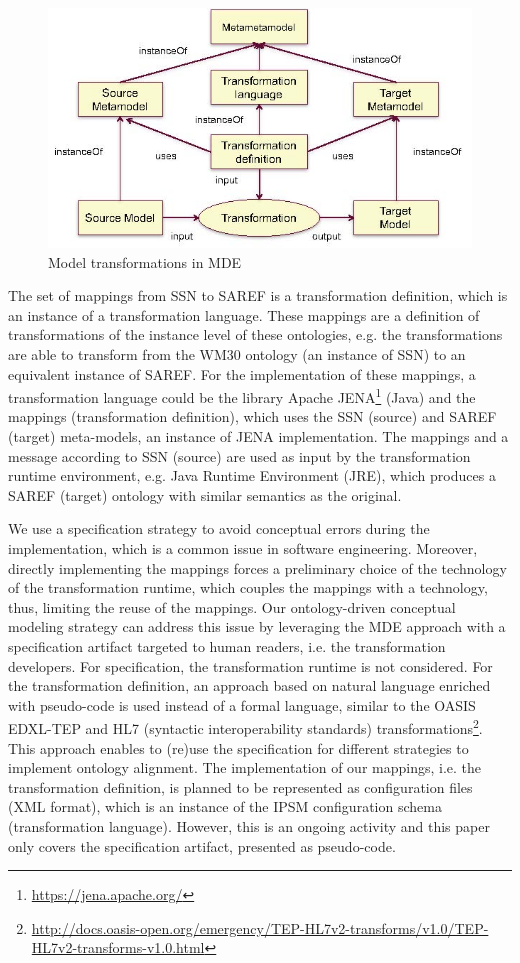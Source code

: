 \documentclass{sig-alternate-05-2015}
\begin{document}
\begin{figure}[h!]
\centering
\includegraphics[scale=0.39]{PastedGraphic-1}
\caption{Model transformations in MDE}
\label{fig:PastedGraphic-1}
\end{figure}

The set of mappings from SSN to SAREF is a transformation definition, which is an instance of a transformation language. These mappings are a definition of transformations of the instance level of these ontologies, e.g. the transformations are able to transform from the WM30 ontology (an instance of SSN) to an equivalent instance of SAREF. For the implementation of these mappings, a transformation language could be the library Apache JENA\footnote{\url{https://jena.apache.org/}} (Java) and the mappings (transformation definition), which uses the SSN (source) and SAREF (target) meta-models, an instance of JENA implementation. The mappings and a message according to SSN (source) are used as input by the transformation runtime environment, e.g. Java Runtime Environment (JRE), which produces a SAREF (target) ontology with similar semantics as the original. 

We use a specification strategy to avoid conceptual errors during the implementation, which is a common issue in software engineering. Moreover, directly implementing the mappings forces a preliminary choice of the technology of the transformation runtime, which couples the mappings with a technology, thus, limiting the reuse of the mappings. Our ontology-driven conceptual modeling strategy \cite{Moreira2017} can address this issue by leveraging the MDE approach with a specification artifact targeted to human readers, i.e. the transformation developers. For specification, the transformation runtime is not considered. For the transformation definition, an approach based on natural language enriched with pseudo-code is used instead of a formal language, similar to the OASIS EDXL-TEP and HL7 (syntactic interoperability standards) transformations\footnote{\url{http://docs.oasis-open.org/emergency/TEP-HL7v2-transforms/v1.0/TEP-HL7v2-transforms-v1.0.html}}. This approach enables to (re)use the specification for different strategies to implement ontology alignment. The implementation of our mappings, i.e. the transformation definition, is planned to be represented as configuration files (XML format), which is an instance of the IPSM configuration schema (transformation language). However, this is an ongoing activity and this paper only covers the specification artifact, presented as pseudo-code. 
\end{document}
